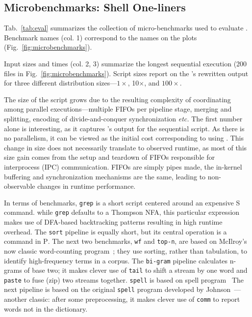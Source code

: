\documentclass[sigplan,10pt,review,anonymous]{acmart}
\newcommand{\etc}{{\em etc.}\xspace}
\newcommand{\ttt}[1]{\texttt{\small #1}}
\newcommand{\cn}[1]{\mbox{\textcircled{\footnotesize #1}}}
\newcommand{\pur}{\cn{\textsc{P}}\xspace}
\newcommand{\sta}{\cn{\textsc{S}}\xspace}
\begin{document}
\subsection{Microbenchmarks: Shell One-liners}

Tab.~\ref{tab:eval} summarizes the collection of micro-benchmarks used to evaluate \sys.
Benchmark names (col. 1) correspond to the names on the plots (Fig.~\ref{fig:microbenchmarks}).

Input sizes and times (col. 2, 3) summarize the longest sequential execution (200 files in Fig.~\ref{fig:microbenchmarks}).
Script sizes report on the \sys's rewritten output for three different distribution sizes---$1\times$, 10$\times$, and $100\times$.

The size of the script grows due to the resulting complexity of coordinating among parallel executions---multiple FIFOs per pipeline stage, merging and splitting, encoding of divide-and-conquer synchronization \etc
The first number alone is interesting, as it captures \sys's output for the sequential script.
As there is no parallelism, it can be viewed as the initial cost corresponding to using \sys.
This change in size does not necessarily translate to observed runtime, as most of this size gain comes from the setup and teardown of FIFOs responsible for interprocess (IPC) communication.
FIFOs are simply pipes made, the in-kernel buffering and synchronization mechanisms are the same, leading to non-observable changes in runtime performance.

In terms of benchmarks, \ttt{grep} is a short script centered around an expensive \sta command.
  while \ttt{grep} defaults to a Thompson NFA, this particular expression makes use of DFA-based backtracking patterns resulting in high runtime overhead.
The \ttt{sort} pipeline is equally short, but its central operation is a command in \pur.
The next two benchmarks, \ttt{wf} and \ttt{top-n}, are based on McIlroy's now classic word-counting program~\cite{bentley1986literate};
  they use sorting, rather than tabulation, to identify high-frequency terms in a corpus.
The \ttt{bi-gram} pipeline calculates n-grams of base two;
  it makes clever use of \ttt{tail} to shift a stream by one word and \ttt{paste} to fuse (zip) two streams together.
\ttt{spell} is based on 
spell program~\cite{bentley1985spelling} 
The next pipeline is based on the original \ttt{spell} program developed by Johnson~\cite{bentley1985spelling}---another \unix classic:
  after some preprocessing, it makes clever use of \ttt{comm} to report words not in the dictionary.
\end{document}
